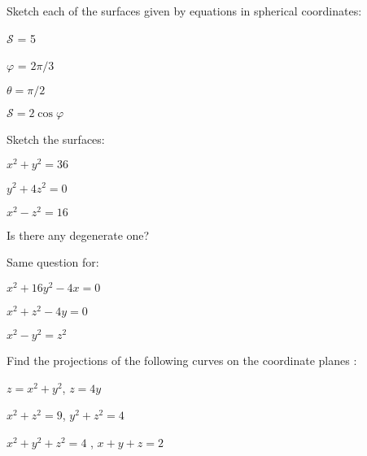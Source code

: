 \documentclass[11pt]{amsbook}
\begin{document}


\begin{hEnumerateArabic}
   		\setcounter{enumi}{97}
    	\item Sketch each of the surfaces given by equations in spherical coordinates:
        	\begin{hEnumerateAlpha}
            	\item $\mathscr{S}$ = 5   %
                \item $\varphi$  = $2\pi/3$
                \item $\theta = \pi/2$
                \item $ \mathscr{S}= 2\cos\varphi$
            \end{hEnumerateAlpha}
        \item Sketch the surfaces:
        	\begin{hEnumerateAlpha}
            	\item $x^2+y^2 = 36$
                \item $y^2+4z^2 = 0$
                \item $x^2-z^2 = 16$ \\
            \end{hEnumerateAlpha} 
        Is there any degenerate one?
        \item Same question for:
        	\begin{hEnumerateAlpha}
            	\item $x^2+16y^2-4x = 0$
                \item $x^2+z^2-4y = 0$
                \item $x^2-y^2 = z^2$
                
            \end{hEnumerateAlpha}
        \item Find the projections of the following curves on the coordinate planes :
        	\begin{hEnumerateAlpha}
            	\item $z = x^2+y^2$, $z = 4y$
                \item $x^2+z^2 = 9$, $y^2+z^2 = 4$
                \item $x^2+y^2+z^2 = 4$ , $x+y+z = 2$
                

\end{hEnumerateAlpha}
\end{hEnumerateArabic}
\end{document}
